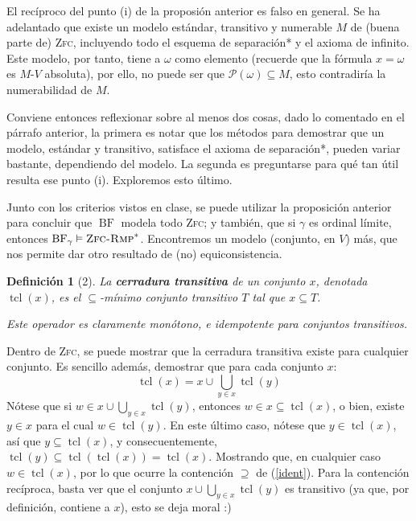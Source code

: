 \documentclass[letterpaper,DIV=15,12pt]{scrartcl}
\theoremstyle{manual}
\newtheorem{definicion}{Definición}
\begin{document}
    El recíproco del punto (i) de la proposión anterior es falso en general. Se ha adelantado que existe un modelo estándar, transitivo y numerable $M$ de (buena parte de) \textsc{Zfc}, incluyendo todo el esquema de separación* y el axioma de infinito. Este modelo, por tanto, tiene a $\omega$ como elemento (recuerde que la fórmula $x=\omega$ es $M$-$V$ absoluta), por ello, no puede ser que $\mathscr{P}(\omega) \subseteq M$, esto contradiría la numerabilidad de $M$.

    Conviene entonces reflexionar sobre al menos dos cosas, dado lo comentado en el párrafo anterior, la primera es notar que los métodos para demostrar que un modelo, estándar y transitivo, satisface el axioma de separación*, pueden variar bastante, dependiendo del modelo. La segunda es preguntarse para qué tan útil resulta ese punto (i). Exploremos esto último.    

    Junto con los criterios vistos en clase, se puede utilizar la proposición anterior para concluir que $\operatorname*{BF}$ modela todo \textsc{Zfc}; y también, que si $\gamma$ es ordinal límite, entonces $\operatorname*{BF}_\gamma \vDash \operatorname*{\textsc{Zfc-Rmp}}^*$. Encontremos un modelo (conjunto, en $V$) más, que nos permite dar otro resultado de (no) equiconsistencia.

    \begin{definicion}[2]\itshape
        La \textbf{cerradura transitiva} de un conjunto $x$, denotada $\operatorname*{tcl}(x)$, es el $\subseteq$-mínimo conjunto transitivo $T$ tal que $x \subseteq T$.

        Este operador es claramente monótono, e idempotente para conjuntos transitivos.
    \end{definicion}
    
    Dentro de \textsc{Zfc}, se puede mostrar que la cerradura transitiva existe para cualquier conjunto. Es sencillo además, demostrar que para cada conjunto $x$:
    \begin{equation}\label{ident}
        \operatorname*{tcl}(x) = x \cup \bigcup_{y \in x} \operatorname*{tcl}(y)
    \end{equation}
    Nótese que si $w \in x \cup \bigcup_{y \in x} \operatorname*{tcl}(y)$, entonces $w \in x \subseteq \operatorname*{tcl}(x)$, o bien, existe $y \in x$ para el cual $w \in \operatorname*{tcl}(y)$. En este último caso, nótese que $y \in \operatorname*{tcl}(x)$, así que $y \subseteq \operatorname*{tcl}(x)$, y consecuentemente, $\operatorname*{tcl}(y) \subseteq \operatorname*{tcl}(\operatorname*{tcl}(x)) = \operatorname*{tcl}(x)$. Mostrando que, en cualquier caso $w \in \operatorname*{tcl}(x)$, por lo que ocurre la contención $\supseteq$ de (\ref{ident}). Para la contención recíproca, basta ver que el conjunto $x \cup \bigcup_{y \in x} \operatorname*{tcl}(y)$ es transitivo (ya que, por definición, contiene a $x$), esto se deja moral :)
    
\end{document}
